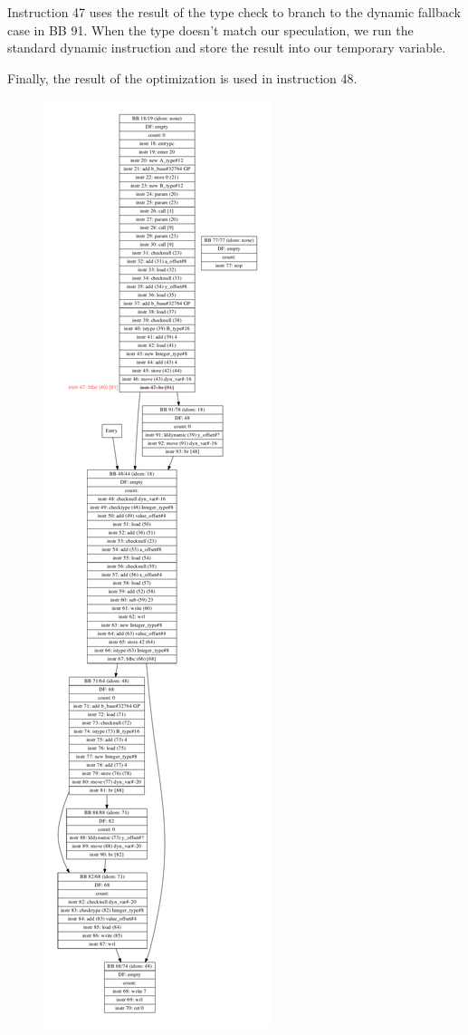 \documentclass[10pt,twocolumn]{article}
\begin{document}
Instruction 47 uses the result of the type check to branch to the
dynamic fallback case in BB 91. When the type doesn't match our
speculation, we run the standard dynamic instruction and store the
result into our temporary variable. 

Finally, the result of the optimization is used in instruction 48.

\begin{figure}
\begin{center}
  \includegraphics[width=0.95\columnwidth]{figs/class-example.pdf}

\end{center}
\end{figure}
\end{document}
